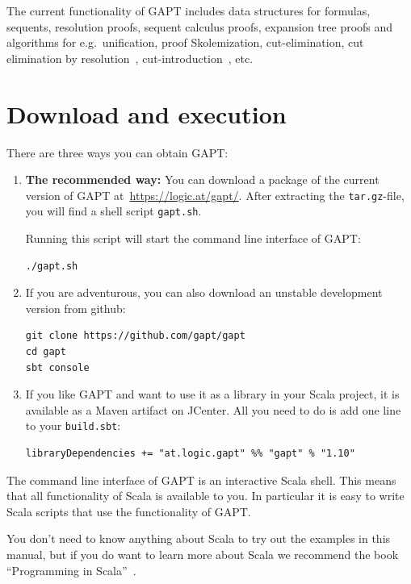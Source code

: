 \documentclass[a4paper,11pt]{article}
\begin{document}
The current functionality of GAPT includes data structures for formulas,
sequents, resolution proofs, sequent calculus proofs, expansion tree proofs and
algorithms for e.g.\ unification, proof Skolemization, cut-elimination, cut
elimination by resolution~\cite{Baaz00CutElimination},
cut-introduction~\cite{Hetzl2012}, etc.

\section{Download and execution}

There are three ways you can obtain GAPT:

\begin{enumerate}

\item {\bfseries The recommended way:}  You can download a package of the current
version of GAPT at~\url{https://logic.at/gapt/}.  After extracting
the \texttt{tar.gz}-file, you will find a shell script \texttt{gapt.sh}.

Running this script will start the command line interface of GAPT:
\begin{lstlisting}
./gapt.sh
\end{lstlisting}

\item If you are adventurous, you can also download an unstable development
  version from github:
\begin{lstlisting}
git clone https://github.com/gapt/gapt
cd gapt
sbt console
\end{lstlisting}

\item If you like GAPT and want to use it as a library in your Scala project,
  it is available as a Maven artifact on JCenter.  All you need to do is add
  one line to your \verb,build.sbt,:
\begin{lstlisting}
libraryDependencies += "at.logic.gapt" %% "gapt" % "1.10"
\end{lstlisting}

\end{enumerate}

The command line interface of GAPT is an interactive Scala shell.  This means
that all functionality of Scala is available to you.  In particular it is easy
to write Scala scripts that use the functionality of GAPT.

You don't need to know anything about Scala to try out the examples in this
manual, but if you do want to learn more about Scala we recommend the book
``Programming in Scala''~\cite{odersky2008programming}.
\end{document}
